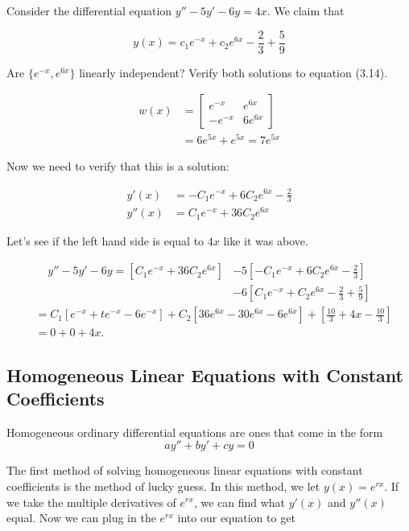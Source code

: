   \begin{eg}
    Consider the differential equation $y''-5y'-6y=4x$. We claim that 

    \[
      y(x)=c_1e^{-x}+c_2e^{6x}-\frac{2}{3}+\frac{5}{9}
    \]

    Are $\{e^{-x},e^{6x}\}$ linearly independent? Verify both solutions to equation (3.14).

    \begin{align*}
      w(x)&=\begin{bmatrix} e^{-x}&e^{6x}\\-e^{-x}&6e^{6x} \end{bmatrix} \\
          &=6e^{5x}+e^{5x}=7e^{5x}
    \end{align*}

    Now we need to verify that this is a solution:

    \begin{align*}
      y'(x)&=-C_1e^{-x}+6C_2e^{6x}-\frac{2}{3}\\
      y''(x)&=C_1e^{-x}+36C_2e^{6x}
    \end{align*}

     Let's see if the left hand side is equal to $4x$ like it was above.

     \begin{align*}
       y''-5y'-6y=\left[C_1e^{-x}+36C_2e^{6x}\right]&-5\left[-C_1e^{-x}+6C_2e^{6x}-\frac{2}{3}\right]\\
                                                    &-6\left[C_1e^{-x}+C_2e^{6x}-\frac{2}{3}+\frac{5}{9}\right]
     \end{align*}
     \begin{align*}
       &=C_1[e^{-x}+te^{-x}-6e^{-x}]+C_2[36e^{6x}-30e^{6x}-6e^{6x}]+\left[\frac{10}{3}+4x-\frac{10}{3}\right]\\
       &=0+0+4x
     .\end{align*}

  \end{eg}

\subsection{Homogeneous Linear Equations with Constant Coefficients}

  Homogeneous ordinary differential equations are ones that come in the form 
  \[
    ay''+by'+cy=0
  \]

  The first method of solving homogeneous linear equations with constant coefficients is the method of lucky guess. In this method, we let $y(x)=e^{rx}$. If we take the multiple derivatives of $e^{rx}$, we can find what $y'(x)$ and $y''(x)$ equal. Now we can plug in the $e^{rx}$ into our equation to get 

